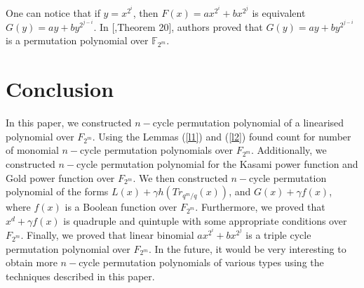 \documentclass[12pt,a4paper]{article}
\begin{document}
One can notice that if $y=x^{2^i}$, then $ F(x)=ax^{2^{i}}+bx^{2^{j}} $ is equivalent $ G(y)=ay+by^{2^{j-i}} $. In [\cite{liu2019triple},Theorem 20], authors proved that $ G(y)=ay+by^{2^{j-i}} $ is a permutation polynomial over $ \mathbb{F}_{2^{m}} $.


\section{Conclusion}\label{sec13}
In this paper, we constructed $ n-$cycle permutation polynomial of a linearised polynomial over $ F_{2^{m}} $. Using the Lemmas (\ref{l1}) and (\ref{l2}) found count for number of monomial $ n-$cycle permutation polynomials over $ F_{2^{m}} $. Additionally,  we constructed $ n-$cycle permutation polynomial for the Kasami power function and Gold power function over $ F_{2^{m}} $.  We  then constructed $ n-$cycle permutation polynomial of the forms $ L(x)+\gamma h(Tr_{q^{m}/q}(x))$, and $  G(x)+\gamma f(x) $, where $ f(x) $ is a Boolean function over $ F_{2^{m}} $. Furthermore, we proved that $ x^{d}+\gamma f(x) $ is quadruple and quintuple with some appropriate conditions over $ F_{2^{m}} $. Finally, we proved that  linear binomial $ ax^{2^{i}}+bx^{2^{j}} $ is a triple cycle permutation polynomial over $ F_{2^{m}} $. In the future, it would be very interesting to obtain more $n-$cycle permutation polynomials of various types using the techniques described in this paper.
\end{document}
